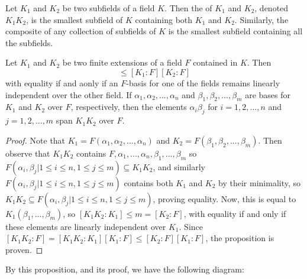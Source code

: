 \begin{definition}
    Let $K_1$ and $K_2$ be two subfields of a field $K$. Then the  of $K_1$ and $K_2$, denoted $K_1K_2$, is the smallest subfield of $K$ containing both $K_1$ and $K_2$. Similarly, the composite of any collection of subfields of $K$ is the smallest subfield containing all the subfields.
\end{definition}



\begin{proposition}
    Let $K_1$ and $K_2$ be two finite extensions of a field $F$ contained in $K$. Then \begin{equation*}
        [K_1K_2:F]\leq [K_1:F][K_2:F]
    \end{equation*}
    with equality if and aonly if an $F$-basis for one of the fields remains linearly independent over the other field. If $\alpha_1,\alpha_2,...,\alpha_n$ and $\beta_1,\beta_2,...,\beta_m$ are bases for $K_1$ and $K_2$ over $F$, respectively, then the elements $\alpha_i\beta_j$ for $i = 1,2,...,n$ and $j = 1,2,...,m$ span $K_1K_2$ over $F$.
\end{proposition}
\begin{proof}
    Note that $K_1=F(\alpha_1,\alpha_2,...,\alpha_n)$ and $K_2 = F(\beta_1,\beta_2,...,\beta_m)$. Then observe that $K_1K_2$ contains $F,\alpha_1,...,\alpha_n,\beta_1,...,\beta_m$ so $F(\alpha_i,\beta_j|1\leq i \leq n,1\leq j \leq m) \subseteq K_1K_2$, and similarly $F(\alpha_i,\beta_j|1\leq i \leq n,1\leq j \leq m)$ contains both $K_1$ and $K_2$ by their minimality, so $K_1K_2 \subseteq F(\alpha_i,\beta_j|1\leq i \leq n,1\leq j \leq m)$, proving equality. Now, this is equal to $K_1(\beta_1,...,\beta_m)$, so $[K_1K_2:K_1]\leq m = [K_2:F]$, with equality if and only if these elements are linearly independent over $K_1$. Since $[K_1K_2:F] = [K_1K_2:K_1][K_1:F] \leq [K_2:F][K_1:F]$, the proposition is proven.
\end{proof}


By this proposition, and its proof, we have the following diagram:
\begin{center}
\end{center}


